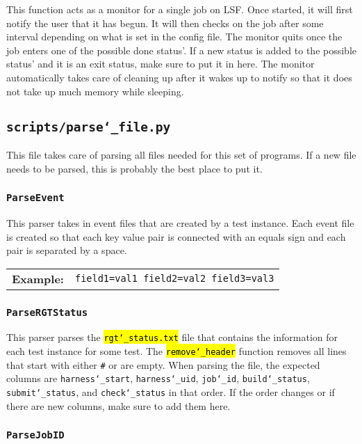 \documentclass{article}
\newcommand{\example}[1]{
\begin{tabular}{ l p{\textwidth} }
	\textbf{Example:} & \texttt{#1}
\end{tabular}
}
\newcommand{\un}[0]{\char`_}
\newcommand{\code}[1]{\textcolor{red}{\hl{\texttt{#1}}}}
\begin{document}
This function acts as a monitor for a single job on LSF. Once started, it will first notify the user that it has begun. It will then checks on the job after some interval depending on what is set in the config file. The monitor quits once the job enters one of the possible done status'. If a new status is added to the possible status' and it is an exit status, make sure to put it in here. The monitor automatically takes care of cleaning up after it wakes up to notify so that it does not take up much memory while sleeping.

\subsection{\texttt{scripts/parse\un file.py}}

This file takes care of parsing all files needed for this set of programs. If a new file needs to be parsed, this is probably the best place to put it.

\subsubsection{\texttt{ParseEvent}}

This parser takes in event files that are created by a test instance. Each event file is created so that each key value pair is connected with an equals sign and each pair is separated by a space.

\example{field1=val1 field2=val2 field3=val3}

\subsubsection{\texttt{ParseRGTStatus}}

This parser parses the \code{rgt\un status.txt} file that contains the information for each test instance for some test. The \code{remove\un header} function removes all lines that start with either \texttt{\#} or are empty. When parsing the file, the expected columns are \texttt{harness\un start}, \texttt{harness\un uid}, \texttt{job\un id}, \texttt{build\un status}, \texttt{submit\un status}, and \texttt{check\un status} in that order. If the order changes or if there are new columns, make sure to add them here.

\subsubsection{\texttt{ParseJobID}}
\end{document}
